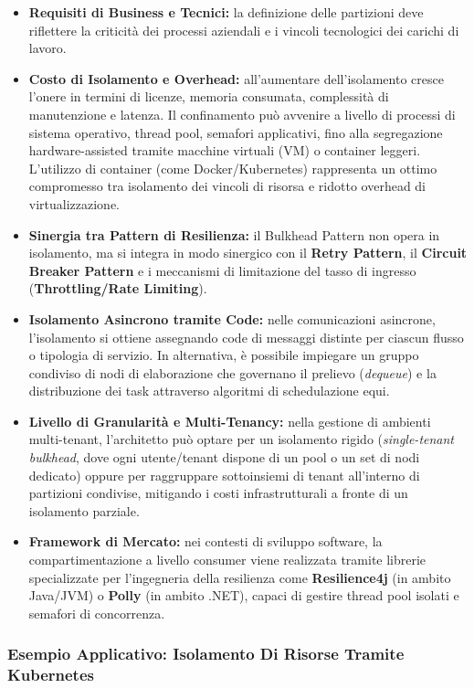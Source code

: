 \documentclass[11pt, a4paper]{article}
\begin{document}
\begin{itemize}
    \item \textbf{Requisiti di Business e Tecnici:} la definizione delle partizioni deve riflettere la criticità dei processi aziendali e i vincoli tecnologici dei carichi di lavoro.
    \item \textbf{Costo di Isolamento e Overhead:} all'aumentare dell'isolamento cresce l'onere in termini di licenze, memoria consumata, complessità di manutenzione e latenza. Il confinamento può avvenire a livello di processi di sistema operativo, thread pool, semafori applicativi, fino alla segregazione hardware-assisted tramite macchine virtuali (VM) o container leggeri. L'utilizzo di container (come Docker/Kubernetes) rappresenta un ottimo compromesso tra isolamento dei vincoli di risorsa e ridotto overhead di virtualizzazione.
    \item \textbf{Sinergia tra Pattern di Resilienza:} il Bulkhead Pattern non opera in isolamento, ma si integra in modo sinergico con il \textbf{Retry Pattern}, il \textbf{Circuit Breaker Pattern} e i meccanismi di limitazione del tasso di ingresso (\textbf{Throttling/Rate Limiting}).
    \item \textbf{Isolamento Asincrono tramite Code:} nelle comunicazioni asincrone, l'isolamento si ottiene assegnando code di messaggi distinte per ciascun flusso o tipologia di servizio. In alternativa, è possibile impiegare un gruppo condiviso di nodi di elaborazione che governano il prelievo (\emph{dequeue}) e la distribuzione dei task attraverso algoritmi di schedulazione equi.
    \item \textbf{Livello di Granularità e Multi-Tenancy:} nella gestione di ambienti multi-tenant, l'architetto può optare per un isolamento rigido (\emph{single-tenant bulkhead}, dove ogni utente/tenant dispone di un pool o un set di nodi dedicato) oppure per raggruppare sottoinsiemi di tenant all'interno di partizioni condivise, mitigando i costi infrastrutturali a fronte di un isolamento parziale.
    \item \textbf{Framework di Mercato:} nei contesti di sviluppo software, la compartimentazione a livello consumer viene realizzata tramite librerie specializzate per l'ingegneria della resilienza come \textbf{Resilience4j} (in ambito Java/JVM) o \textbf{Polly} (in ambito .NET), capaci di gestire thread pool isolati e semafori di concorrenza.
\end{itemize}

\subsubsection{Esempio Applicativo: Isolamento Di Risorse Tramite Kubernetes}
\end{document}
